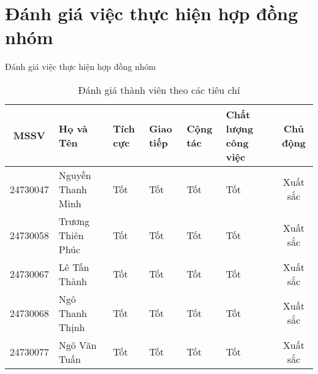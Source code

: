 \documentclass{beamer}
\begin{document}
\section{Đánh giá việc thực hiện hợp đồng nhóm}
\begin{frame}{Đánh giá việc thực hiện hợp đồng nhóm}
\fontsize{8pt}{9pt}\selectfont
\begin{table}[h!]
    \centering
    \begin{tabular}{|c|l|p{20pt}|p{20pt}|p{20pt}|p{40pt}|c|}
        \hline
        \textbf{MSSV}      & \textbf{Họ và Tên} & \textbf{Tích cực} & \textbf{Giao tiếp} & \textbf{Cộng tác} & \textbf{Chất lượng công việc} & \textbf{Chủ động} \\
        \hline
        24730047           & Nguyễn Thanh Minh  &
        Tốt & Tốt & Tốt & Tốt & Xuất sắc                                                                        \\
        \hline
        24730058           & Trương Thiên Phúc  & Tốt & Tốt & Tốt & Tốt & Xuất sắc                                                                         \\
        \hline
        24730067           & Lê Tấn Thành       & Tốt & Tốt & Tốt & Tốt & Xuất sắc                                                                          \\
        \hline
        24730068           & Ngô Thanh Thịnh    & Tốt & Tốt & Tốt & Tốt & Xuất sắc                                                                        \\
        \hline
        24730077           & Ngô Văn Tuấn       & Tốt & Tốt & Tốt & Tốt & Xuất sắc                                                                          \\
        \hline
    \end{tabular}
    \caption{Đánh giá thành viên theo các tiêu chí}
    \label{tab:member_ratings}
\end{table}
\end{frame}
\end{document}
